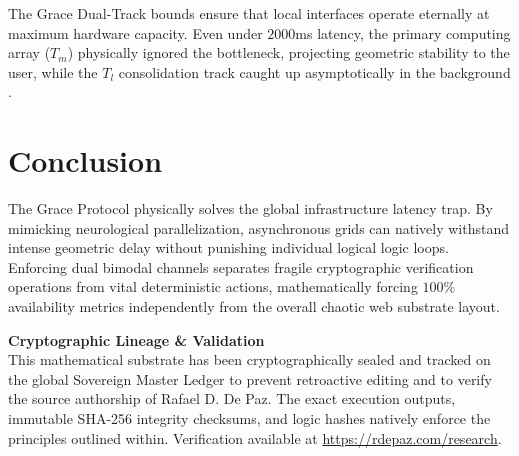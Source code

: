 \documentclass[12pt, a4paper]{article}
\theoremstyle{plain}
\theoremstyle{definition}
\begin{document}
The Grace Dual-Track bounds ensure that local interfaces operate eternally at maximum hardware capacity. Even under $2000$ms latency, the primary computing array ($T_m$) physically ignored the bottleneck, projecting geometric stability to the user, while the $T_l$ consolidation track caught up asymptotically in the background \cite{chandy1985distributed}.

\section{Conclusion}
The Grace Protocol physically solves the global infrastructure latency trap. By mimicking neurological parallelization, asynchronous grids can natively withstand intense geometric delay without punishing individual logical logic loops. Enforcing dual bimodal channels separates fragile cryptographic verification operations from vital deterministic actions, mathematically forcing $100\%$ availability metrics independently from the overall chaotic web substrate layout.





\vspace{3em}
\noindent\hrulefill
\vspace{1em}

\noindent\textbf{Cryptographic Lineage \& Validation}\\
This mathematical substrate has been cryptographically sealed and tracked on the global Sovereign Master Ledger to prevent retroactive editing and to verify the source authorship of Rafael D. De Paz. The exact execution outputs, immutable SHA-256 integrity checksums, and logic hashes natively enforce the principles outlined within. Verification available at \url{https://rdepaz.com/research}.
\end{document}
